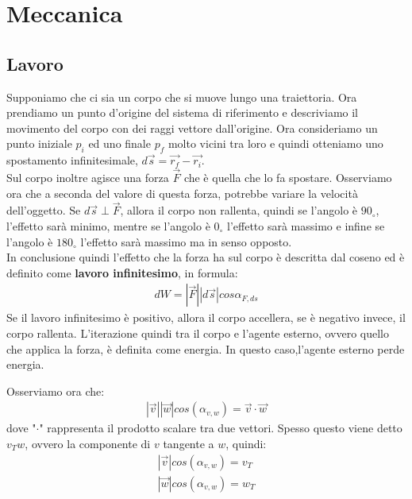 \section{Meccanica}
    \subsection{Lavoro}
        Supponiamo che ci sia un corpo che si muove lungo una traiettoria. Ora prendiamo un punto d'origine del sistema di riferimento e descriviamo il movimento del corpo con dei raggi vettore dall'origine. Ora consideriamo un punto iniziale $p_i$ ed uno finale $p_f$ molto vicini tra loro e quindi otteniamo uno spostamento infinitesimale, $d\vec{s}=\vec{r_f} - \vec{r_i}$.\\
        Sul corpo inoltre agisce una forza $\vec{F}$ che è quella che lo fa spostare. Osserviamo ora che a seconda del valore di questa forza, potrebbe variare la velocità dell'oggetto. Se $d\vec{s}\perp\vec{F}$, allora il corpo non rallenta, quindi se l'angolo è $90_{\circ}$, l'effetto sarà minimo, mentre se l'angolo è $0_{\circ}$ l'effetto sarà massimo e infine se l'angolo è $180_{\circ}$ l'effetto sarà massimo ma in senso opposto.\\
        In conclusione quindi l'effetto che la forza ha sul corpo è descritta dal coseno ed è definito come \textbf{lavoro infinitesimo}, in formula:
        \begin{align*}
            dW=|\vec{F}||d\vec{s}|cos\alpha_{F,ds}
        \end{align*}
        Se il lavoro infinitesimo è positivo, allora il corpo accellera, se è negativo invece, il corpo rallenta. L'iterazione quindi tra il corpo e l'agente esterno, ovvero quello che applica la forza, è definita come energia. In questo caso,l'agente esterno perde energia.\\
        \begin{mdframed}
            Osserviamo ora che:
            \begin{align*}
                |\vec{v}||\vec{w}|cos(\alpha_{v,w})=\vec{v}\cdot\vec{w}
            \end{align*}
            dove "$\cdot$" rappresenta il prodotto scalare tra due vettori.
            Spesso questo viene detto $v_T w$, ovvero la componente di $v$ tangente a $w$, quindi:
            \begin{align*}
                |\vec{v}|cos(\alpha_{v,w})=v_T\\
                |\vec{w}|cos(\alpha_{v,w})=w_T
            \end{align*}
        \end{mdframed}
